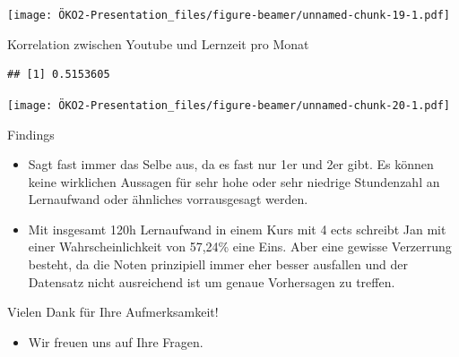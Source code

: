 \documentclass[
  ignorenonframetext,
]{beamer}
\providecommand{\tightlist}{%
  \setlength{\itemsep}{0pt}\setlength{\parskip}{0pt}}
\begin{document}
\begin{frame}
\texttt{[image: ÖKO2-Presentation\_files/figure-beamer/unnamed-chunk-19-1.pdf]}
\end{frame}

\begin{frame}[fragile]
\begin{block}{Korrelation zwischen Youtube und Lernzeit pro Monat}
\protect\hypertarget{korrelation-zwischen-youtube-und-lernzeit-pro-monat}{}
\begin{verbatim}
## [1] 0.5153605
\end{verbatim}

\texttt{[image: ÖKO2-Presentation\_files/figure-beamer/unnamed-chunk-20-1.pdf]}
\end{block}
\end{frame}

\begin{frame}
\begin{block}{Findings}
\protect\hypertarget{findings-1}{}
\begin{itemize}
\tightlist
\item
  Sagt fast immer das Selbe aus, da es fast nur 1er und 2er gibt. Es
  können keine wirklichen Aussagen für sehr hohe oder sehr niedrige
  Stundenzahl an Lernaufwand oder ähnliches vorrausgesagt werden.
\item
  Mit insgesamt 120h Lernaufwand in einem Kurs mit 4 ects schreibt Jan
  mit einer Wahrscheinlichkeit von 57,24\% eine Eins. Aber eine gewisse
  Verzerrung besteht, da die Noten prinzipiell immer eher besser
  ausfallen und der Datensatz nicht ausreichend ist um genaue
  Vorhersagen zu treffen.
\end{itemize}
\end{block}
\end{frame}

\begin{frame}
\begin{block}{Vielen Dank für Ihre Aufmerksamkeit!}
\protect\hypertarget{vielen-dank-fuxfcr-ihre-aufmerksamkeit}{}
\begin{itemize}
\tightlist
\item
  Wir freuen uns auf Ihre Fragen.
\end{itemize}
\end{block}
\end{frame}
\end{document}
